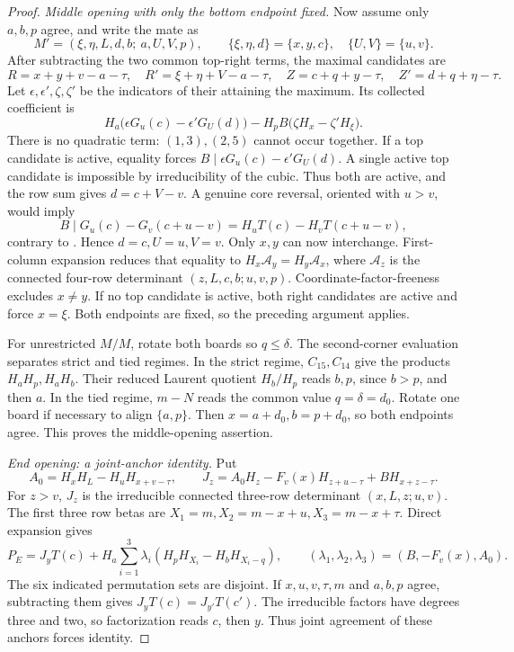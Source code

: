 \documentclass[11pt,a4paper]{amsart}
\numberwithin{equation}{section}
\theoremstyle{plain}
\theoremstyle{definition}
\begin{document}
\begin{proof}
\emph{Middle opening with only the bottom endpoint fixed.}
Now assume only \(a,b,p\) agree, and write the mate as
\[
 M'=(\xi,\eta,L,d,b;\ a,U,V,p),\qquad
 \{\xi,\eta,d\}=\{x,y,c\},\quad \{U,V\}=\{u,v\}.
\]
After subtracting the two common top-right terms, the maximal candidates
are
\[
 R=x+y+v-a-\tau,\quad R'=\xi+\eta+V-a-\tau,\quad
 Z=c+q+y-\tau,\quad Z'=d+q+\eta-\tau.
\]
Let \(\epsilon,\epsilon',\zeta,\zeta'\) be the indicators of their
attaining the maximum.  Its collected coefficient is
\[
 H_a\bigl(\epsilon G_u(c)-\epsilon'G_U(d)\bigr)
 -H_pB\bigl(\zeta H_x-\zeta'H_\xi\bigr).
\]
There is no quadratic term: \((1,3),(2,5)\) cannot occur together.  
If a top candidate is active, equality forces
\(B\mid\epsilon G_u(c)-\epsilon'G_U(d)\).  A single active top
candidate is impossible by irreducibility of the cubic.  Thus both
are active, and the row sum gives \(d=c+V-v\).  A genuine core
reversal, oriented with \(u>v\), would imply
\[
 B\mid G_u(c)-G_v(c+u-v)
       =H_uT(c)-H_vT(c+u-v),
\]
contrary to .  Hence \(d=c,U=u,V=v\).  
Only \(x,y\) can now interchange.  First-column expansion reduces
that equality to \(H_x\mathcal A_y=H_y\mathcal A_x\), where
\(\mathcal A_z\) is the connected four-row determinant
\((z,L,c,b;u,v,p)\).  Coordinate-factor-freeness excludes \(x\ne y\).  
If no top candidate is active, both right candidates are active and
force \(x=\xi\).  Both endpoints are fixed, so the preceding argument
applies.  

For unrestricted \(M/M\), rotate both boards so \(q\le\delta\).  
The second-corner evaluation separates strict and tied regimes.  In
the strict regime, \(C_{15},C_{14}\) give the products
\(H_aH_p,H_aH_b\).  Their reduced Laurent quotient \(H_b/H_p\)
reads \(b,p\), since \(b>p\), and then \(a\).  In the tied regime,
\(m-N\) reads the common value \(q=\delta=d_0\).  Rotate one board
if necessary to align \(\{a,p\}\).  Then
\(x=a+d_0,b=p+d_0\), so both endpoints agree.  This proves the
middle-opening assertion.  

\emph{End opening: a joint-anchor identity.}
Put
\[
 A_0=H_xH_L-H_uH_{x+v-\tau},\qquad
 J_z=A_0H_z-F_v(x)H_{z+u-\tau}+BH_{x+z-\tau}.
\]
For \(z>v\), \(J_z\) is the irreducible connected three-row
determinant \((x,L,z;u,v)\).  The first three row betas are
\(X_1=m,X_2=m-x+u,X_3=m-x+\tau\).  Direct expansion gives
\begin{equation}\label{eq:five-end-block}
 P_E=J_yT(c)+H_a\sum_{i=1}^3\lambda_i
       (H_pH_{X_i}-H_bH_{X_i-q}),\qquad
 (\lambda_1,\lambda_2,\lambda_3)=(B,-F_v(x),A_0).
\end{equation}
The six indicated permutation sets are disjoint.  If
\(x,u,v,\tau,m\) and \(a,b,p\) agree, subtracting them gives
\(J_yT(c)=J_{y'}T(c')\).  The irreducible factors have degrees three
and two, so factorization reads \(c\), then \(y\).  Thus joint
agreement of these anchors forces identity.  


\end{proof}
\end{document}

